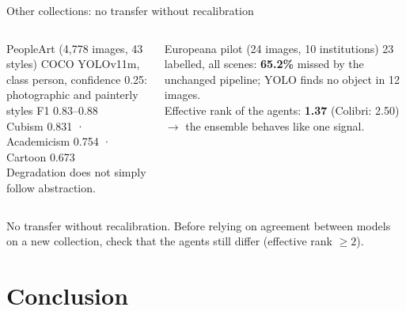 \documentclass[aspectratio=169,10pt]{beamer}
\newcommand{\takeaway}[1]{\vfill\begin{keybox}#1\end{keybox}}
\begin{document}
\begin{frame}{Other collections: no transfer without recalibration}
\begin{columns}[T,onlytextwidth]
\begin{defbox}{PeopleArt (4,778 images, 43 styles)}
COCO YOLOv11m, class person, confidence 0.25:\\[2pt]
photographic and painterly styles F1 0.83--0.88\\
Cubism 0.831 \;·\; Academicism 0.754 \;·\; Cartoon 0.673\\[2pt]
Degradation does not simply follow abstraction.
\end{defbox}
\begin{defbox}{Europeana pilot (24 images, 10 institutions)}
23 labelled, all scenes: \textbf{65.2\%} missed by the unchanged pipeline; YOLO finds no object in 12 images.\\[2pt]
Effective rank of the agents: \textbf{1.37} (Colibri: 2.50) $\to$ the ensemble behaves like one signal.
\end{defbox}
\end{columns}
\takeaway{No transfer without recalibration. Before relying on agreement between models on a new collection, check that the agents still differ (effective rank $\geq 2$).}
\end{frame}

\section{Conclusion}
\end{document}
